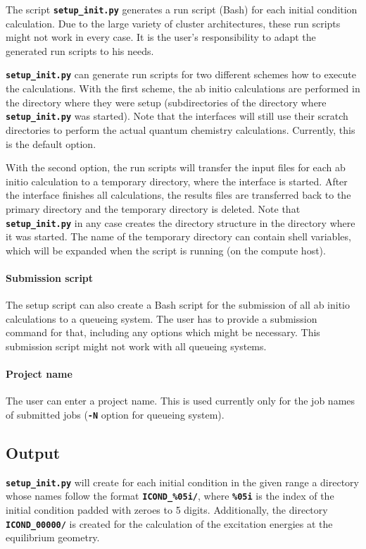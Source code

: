 \documentclass[a4paper,10pt,DIV=15,openany,twoside=false]{scrbook}
\newcommand{\ttt}[1]{\textbf{\texttt{#1}}}
\begin{document}
The script \ttt{setup\_init.py} generates a run script (Bash) for each initial condition calculation. Due to the large variety of cluster architectures, these run scripts might not work in every case. It is the user's responsibility to adapt the generated run scripts to his needs.

\ttt{setup\_init.py} can generate run scripts for two different schemes how to execute the calculations. With the first scheme, the ab initio calculations are performed in the directory where they were setup (subdirectories of the directory where \ttt{setup\_init.py} was started). Note that the interfaces will still use their scratch directories to perform the actual quantum chemistry calculations. Currently, this is the default option.

With the second option, the run scripts will transfer the input files for each ab initio calculation to a temporary directory, where the interface is started. After the interface finishes all calculations, the results files are transferred back to the primary directory and the temporary directory is deleted. Note that \ttt{setup\_init.py} in any case creates the directory structure in the directory where it was started. The name of the temporary directory can contain shell variables, which will be expanded when the script is running (on the compute host).

\paragraph{Submission script}

The setup script can also create a Bash script for the submission of all ab initio calculations to a queueing system. The user has to provide a submission command for that, including any options which might be necessary. This submission script might not work with all queueing systems.

\paragraph{Project name}

The user can enter a project name. This is used currently only for the job names of submitted jobs (\ttt{-N} option for queueing system).

\subsection{Output}

\ttt{setup\_init.py} will create for each initial condition in the given range a directory whose names follow the format \ttt{ICOND\_\%05i/}, where \ttt{\%05i} is the index of the initial condition padded with zeroes to 5 digits. Additionally, the directory \ttt{ICOND\_00000/} is created for the calculation of the excitation energies at the equilibrium geometry.
\end{document}
